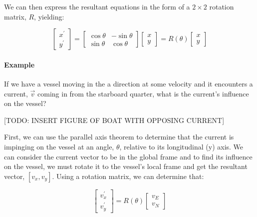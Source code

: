 We can then express the resultant equations in the form of a $2 \times 2$ rotation matrix, $R$, yielding:

\begin{equation*}
    \left[
        \begin{matrix}
            x^{\prime} \\ 
            y^{\prime}
        \end{matrix}
    \right]
    =
    \left[
        \begin{matrix}
            \cos\theta & -\sin\theta \\
            \sin\theta & \cos\theta
        \end{matrix}
    \right]
    \left[
        \begin{matrix}
            x \\
            y
        \end{matrix}
    \right]
    = R(\theta)
    \left[
        \begin{matrix}
            x \\
            y
        \end{matrix}
    \right]
\end{equation*}

\paragraph*{Example} If we have a vessel moving in the a direction at some velocity and it encounters a current, $\vec{v}$ coming in from the starboard quarter, what is the current's influence on the vessel?

[TODO: INSERT FIGURE OF BOAT WITH OPPOSING CURRENT]

First, we can use the parallel axis theorem to determine that the current is impinging on the vessel at an angle, $\theta$, relative to its longitudinal (y) axis.
We can consider the current vector to be in the global frame and to find its influence on the vessel, we must rotate it to the vessel's local frame and get the resultant vector, $[v_x, v_y]$.
Using a rotation matrix, we can determine that:

\begin{equation*}
    \left[
        \begin{matrix}
            v_x^{\prime} \\
            v_y^{\prime}
        \end{matrix}
    \right] = 
    R(\theta) \left[
        \begin{matrix}
            v_E \\
            v_N
        \end{matrix}
    \right]
\end{equation*}

